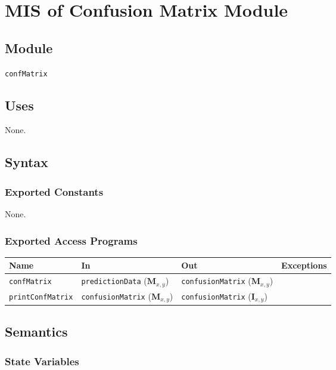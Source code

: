 \documentclass[12pt, titlepage]{article}
\def\code#1{\texttt{#1}}
\begin{document}
\section{MIS of Confusion Matrix Module} \label{ModuleCM} 

\subsection{Module}

\code{confMatrix}

\subsection{Uses}

None.

\subsection{Syntax}

\subsubsection{Exported Constants}

None.

\subsubsection{Exported Access Programs}

\begin{center}
\begin{tabular}{p{2cm} p{4cm} p{4cm} p{2cm}}
\hline
\textbf{Name} & \textbf{In} & \textbf{Out} & \textbf{Exceptions} \\
\hline
\code{confMatrix} & \code{predictionData} ($\mathbf{M}_{x,y}$) & \code{confusionMatrix} ($\mathbf{M}_{x,y}$)  &  \\
\code{printConfMatrix} & \code{confusionMatrix} ($\mathbf{M}_{x,y}$) & \code{confusionMatrix} ($\mathbf{I}_{x,y}$)  &  \\
\hline
\end{tabular}
\end{center}

\subsection{Semantics}

\subsubsection{State Variables}
\end{document}
